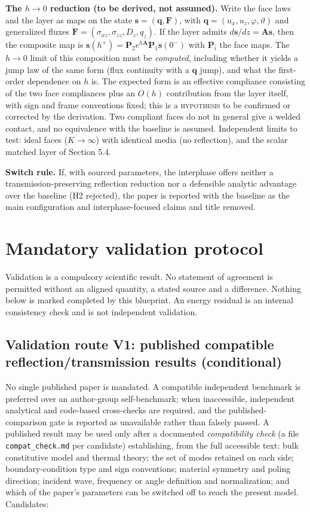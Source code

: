 \documentclass[11pt]{article}
\begin{document}
\textbf{The $h\to0$ reduction (to be derived, not assumed).} Write the face laws
and the layer as maps on the state $\bm{s}=(\bm{q},\bm{F})$, with
$\bm{q}=(u_x,u_z,\varphi,\vartheta)$ and generalized fluxes
$\bm{F}=(\sigma_{xz},\sigma_{zz},D_z,q_z)$. If the layer admits
$d\bm{s}/dz=\bm{A}\bm{s}$, then the composite map is
$\bm{s}(h^{+}) = \bm{P}_2 e^{h\bm{A}}\bm{P}_1\bm{s}(0^{-})$ with $\bm{P}_i$ the
face maps. The $h\to0$ limit of this composition must be \emph{computed},
including whether it yields a jump law of the same form (flux continuity with a
$\bm{q}$ jump), and what the first-order dependence on $h$ is. The expected form is
an effective compliance consisting of the two face compliances plus an $O(h)$
contribution from the layer itself, with sign and frame conventions fixed; this is
a \textsc{hypothesis} to be confirmed or corrected by the derivation. Two
compliant faces do not in general give a welded contact, and no equivalence with
the baseline is assumed. Independent limits to test: ideal faces ($K\to\infty$)
with identical media (no reflection), and the scalar matched layer of
Section 5.4.

\textbf{Switch rule.} If, with sourced parameters, the interphase offers neither a
transmission-preserving reflection reduction nor a defensible analytic advantage
over the baseline (H2 rejected), the paper is reported with the baseline as the
main configuration and interphase-focused claims and title removed.

\section{Mandatory validation protocol}

Validation is a compulsory scientific result. No statement of agreement is
permitted without an aligned quantity, a stated source and a difference. Nothing
below is marked completed by this blueprint. An energy residual is an internal
consistency check and is not independent validation.

\subsection{Validation route V1: published compatible reflection/transmission
results (conditional)}

No single published paper is mandated. A compatible independent benchmark is
preferred over an author-group self-benchmark; when inaccessible, independent
analytical and code-based cross-checks are required, and the published-comparison
gate is reported as unavailable rather than falsely passed. A published result may
be used only after a documented \emph{compatibility check} (a file
\texttt{compat\_check.md} per candidate) establishing, from the full accessible
text: bulk constitutive model and thermal theory; the set of modes retained on
each side; boundary-condition type and sign conventions; material symmetry and
poling direction; incident wave, frequency or angle definition and normalization;
and which of the paper's parameters can be switched off to reach the present
model. Candidates:
\end{document}
